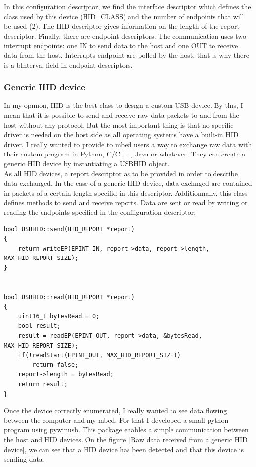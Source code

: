 \documentclass[pdftex,10pt,a4paper]{report}
\begin{document}
In this configuration descriptor, we find the interface descriptor which defines the class used by this device (HID\_CLASS) and the number of endpoints that will be used (2). The HID descriptor gives information on the length of the report descriptor. Finally, there are endpoint descriptors. The communication uses two interrupt endpoints: one IN to send data to the host and one OUT to receive data from the host. Interrupts endpoint are polled by the host, that is why there is a bInterval field in endpoint descriptors.
\\


\subsubsection{Generic HID device}
In my opinion, HID is the best class to design a custom USB device. By this, I mean that it is possible to send and receive raw data packets to and from the host without any protocol. But the most important thing is that no specific driver is needed on the host side as all operating systems have a built-in HID driver. I really wanted to provide to mbed users a way to exchange raw data with their custom program in Python, C/C++, Java or whatever. They can create a generic HID device by instantiating a USBHID object. \\

As all HID devices, a report descriptor as to be provided in order to describe data exchanged. In the case of a generic HID device, data exchnged are contained in packets of a certain length specifid in this descriptor. Additionnally, this class defines methods to send and receive reports. Data are sent or read by writing or reading the endpoints specified in the confiiguration descriptor:

\begin{lstlisting}[label=Send and receive HID reports,caption=Send and receive HID reports]
bool USBHID::send(HID_REPORT *report)
{
    return writeEP(EPINT_IN, report->data, report->length, MAX_HID_REPORT_SIZE);
}


bool USBHID::read(HID_REPORT *report)
{
    uint16_t bytesRead = 0;
    bool result;
    result = readEP(EPINT_OUT, report->data, &bytesRead, MAX_HID_REPORT_SIZE);
    if(!readStart(EPINT_OUT, MAX_HID_REPORT_SIZE))
        return false;
    report->length = bytesRead;
    return result;
}
\end{lstlisting}

Once the device correctly enumerated, I really wanted to see data flowing between the computer and my mbed. For that I developed a small python program using pywinusb. This package enables a simple communication between the host and HID devices. On the figure~\ref{Raw data received from a generic HID device}, we can see that a HID device has been detected and that this device is sending data.
\end{document}
